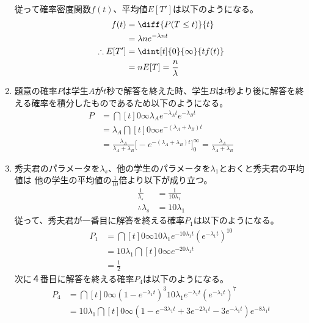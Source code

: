 \begin{enumerate}[(1)]
\begin{align*}
        \end{align*}
        従って確率密度関数$f(t)$、平均値$E[T']$は以下のようになる。
        \begin{align*}
            f(t) &= \diff{P(T \leq t)}{t}\\
            &= \lambda n e^{- \lambda n t}\\
            \therefore E[T'] &= \dint[t]{0}{\infty}{tf(t)}\\
            &= n E[T] = \frac{n}{\lambda}\\
        \end{align*}
    \item 題意の確率$P$は学生$A$が$t$秒で解答を終えた時、学生$B$は$t$秒より後に解答を終える確率を積分したものであるため以下のようになる。
        \begin{align*}
            P &= \dint[t]{0}{\infty}{\lambda_Ae^{-\lambda_A t}e^{-\lambda_B t}}\\
            &= \lambda_A \dint[t]{0}{\infty}{e^{-(\lambda_A + \lambda_B)t}}\\
            &= \frac{\lambda_A}{\lambda_A + \lambda_B} \bigl[-e^{-(\lambda_A + \lambda_B)t}\bigr]_{0}^{\infty} 
            = \frac{\lambda_A}{\lambda_A + \lambda_B} 
        \end{align*}
    \item 秀夫君のパラメータを$\lambda_s$、他の学生のパラメータを$\lambda_1$とおくと秀夫君の平均値は
    他の学生の平均値の$\frac{1}{10}$倍より以下が成り立つ。
        \begin{align*}
            \frac{1}{\lambda_s} &= \frac{1}{10\lambda_1}\\
            \therefore \lambda_s &= 10\lambda_1
        \end{align*}
        従って、秀夫君が一番目に解答を終える確率$P_1$は以下のようになる。
        \begin{align*}
            P_1 &= \dint[t]{0}{\infty}{10\lambda_1 e^{-10\lambda_1 t}\left(e^{-\lambda_1 t}\right)^{10}}\\
            &= 10\lambda_1 \dint[t]{0}{\infty}{e^{-20\lambda_1 t}}\\
            &= \frac{1}{2}
        \end{align*}
        次に４番目に解答を終える確率$P_4$は以下のようになる。
        \begin{align*}
            P_4 &= \dint[t]{0}{\infty}{\left(1 - e^{-\lambda_1 t}\right)^{3}10\lambda_1 e^{-\lambda_1 t}\left(e^{-\lambda_1 t}\right)^{7}}\\
            &= 10\lambda_1 \dint[t]{0}{\infty}{\left(1 - e^{-3\lambda_1 t} + 3e^{-2\lambda_1 t} - 3e^{-\lambda_1 t}\right)e^{-8\lambda_1 t}}\\

\end{align*}
\end{enumerate}
